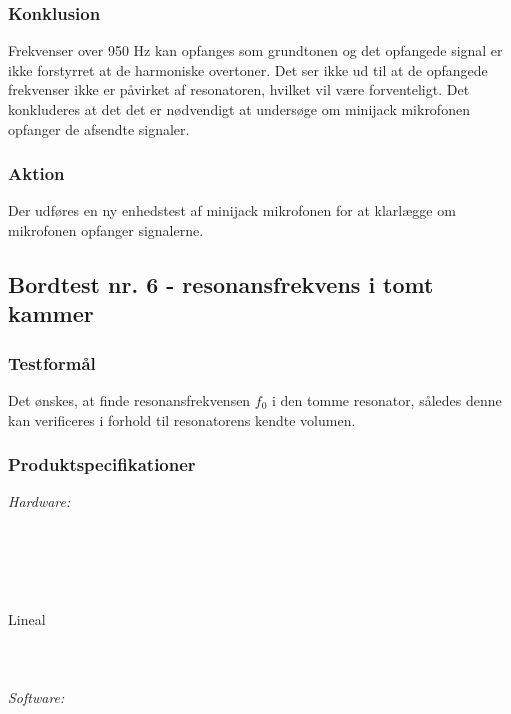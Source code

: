			\subsubsection{Konklusion}
			Frekvenser over 950 Hz kan opfanges som grundtonen og det opfangede signal er ikke forstyrret at de harmoniske overtoner. Det ser ikke ud til at de opfangede frekvenser ikke er påvirket af resonatoren, hvilket vil være forventeligt. Det konkluderes at det det er nødvendigt at undersøge om minijack mikrofonen opfanger de afsendte signaler. 
			
			\subsubsection{Aktion}
			 Der udføres en ny enhedstest af minijack mikrofonen for at klarlægge om mikrofonen opfanger signalerne. 
			 
 	\subsection{Bordtest nr. 6 - resonansfrekvens i tomt kammer}
	
	\subsubsection{Testformål}
	Det ønskes, at finde resonansfrekvensen $f_{0}$ i den tomme resonator, således denne kan verificeres i forhold til resonatorens kendte volumen.  	
	
	\subsubsection{Produktspecifikationer}
	\textit{Hardware:}\\
	\\
	\elektretto\\
	\daq\\
	\\	
	\snot\\	
	Lineal\\
	\modellervoks\\
	\plade\\
	\PC\\
	
	\textit{Software:}\\
	\labview\\
	\daqsoft\\
	\onlineg\\
	
